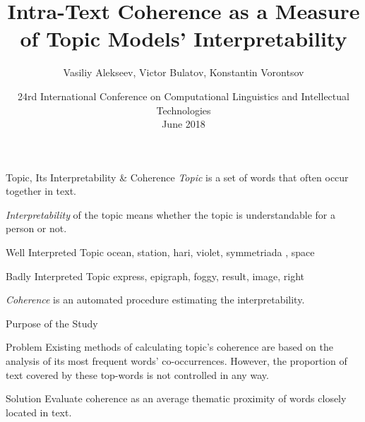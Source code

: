 \documentclass[russian]{beamer}
\title[Intra-Text Coherence]
{
  Intra-Text Coherence as a Measure of Topic Models’ Interpretability
}
\subtitle{}
\author[Vasiliy Alekseev]{
  Vasiliy Alekseev, %
  Victor Bulatov,
  Konstantin Vorontsov
}
\institute[]
{
  \footnotesize
}
\date[Dialogue 2018]
{
  \footnotesize
  {
    24rd International Conference on Computational Linguistics and Intellectual Technologies\\ \bigskip 1 June 2018
  }
}
\begin{document}

		

  
\frame{\titlepage}


\begin{frame}{Topic, Its Interpretability \& Coherence}
  \emph{Topic} is a set of words that often occur together in text.
  
  \medskip
  
  \emph{Interpretability} of the topic means whether the topic is understandable for a person or not.
  
  \vspace{0.25cm}
  
  \begin{exampleblock}{Well Interpreted Topic}
    ocean, station, hari, violet, symmetriada , space
  \end{exampleblock}
  
  \begin{alertblock}{Badly Interpreted Topic}
    express, epigraph, foggy, result, image, right
  \end{alertblock}
  
  \vspace{0.25cm}
  
  \emph{Coherence} is an automated procedure estimating the interpretability.
\end{frame}


\begin{frame}{Purpose of the Study}
  \begin{block}{Problem}
    Existing methods of calculating topic's coherence are based on the analysis of its most frequent words' co-occurrences.
    However, the proportion of text covered by these top-words is not controlled in any way.
  \end{block}
  \begin{block}{Solution}
    Evaluate coherence as an average thematic proximity of words closely located in text.
  \end{block}
\end{frame}
\end{document}
